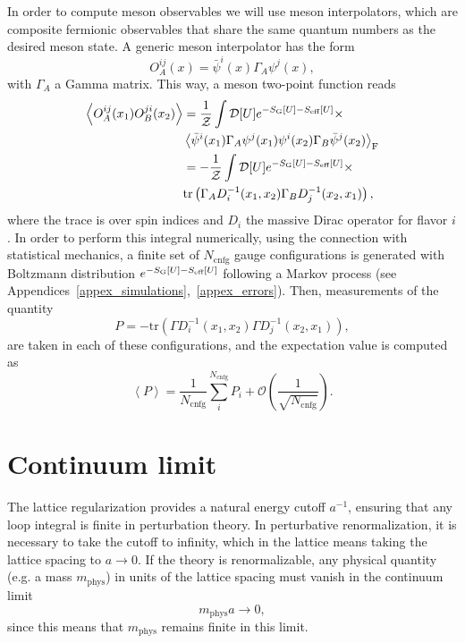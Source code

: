 In order to compute meson observables we will use meson interpolators, which are composite fermionic observables that share the same quantum numbers as the desired meson state. A generic meson interpolator has the form
\begin{equation}
{O}_A^{ij}(x)=\bar{\psi}^i(x)\Gamma_A\psi^j(x),
\end{equation}	
with $\Gamma_A$ a Gamma matrix. This way, a meson two-point function reads
\begin{align}
\label{ch_foundation:eq:path_int}
\left<{O}_A^{ij}(x_1){O}_B^{ji}(x_2)\right>&=\frac{1}{\mathcal{Z}}\int\mathcal{D}[U]e^{-S_{\textrm G}[U]-S_{\textrm{eff}}[U]}\times\\&\left<\bar{\psi}^i(x_1)\Gamma_A\psi^j(x_1)\psi^i(x_2)\Gamma_B\bar{\psi}^j(x_2)\right>_{\textrm F} \\
&=-\frac{1}{\mathcal{Z}}\int\mathcal{D}[U]e^{-S_{\textrm G}[U]-S_{\textrm{eff}}[U]}\times\\&{\textrm{tr}}\left(\Gamma_AD_i^{-1}(x_1,x_2)\Gamma_BD_j^{-1}(x_2,x_1)\right),
\end{align}
where the trace is over spin indices and $D_i$ the massive Dirac operator for flavor $i$. In order to perform this integral numerically, using the connection with statistical mechanics, a finite set of $N_{\textrm{cnfg}}$ gauge configurations is generated with Boltzmann distribution $e^{-S_{\textrm G}[U]-S_{\textrm{eff}}[U]}$ following a Markov process (see Appendices~\ref{appex_simulations},~\ref{appex_errors}). Then, measurements of the quantity
\begin{equation}
P=-{\textrm{tr}}\left(\Gamma D_i^{-1}(x_1,x_2)\Gamma D_j^{-1}(x_2,x_1)\right),
\end{equation}
are taken in each of these configurations, and the expectation value is computed as
\begin{equation}
\left<P\right>=\frac{1}{N_{\textrm{cnfg}}}\sum_{i}^{N_{\textrm{cnfg}}}P_i+\mathcal{O}\left(\frac{1}{\sqrt{N_{\textrm{cnfg}}}}\right).
\end{equation}



\section{Continuum limit}
\label{ch_foundation:sec:continuum-limit}

The lattice regularization provides a natural energy cutoff $a^{-1}$, ensuring that any loop integral is finite in perturbation theory. In perturbative renormalization, it is necessary to take the cutoff to infinity, which in the lattice means taking the lattice spacing to $a\rightarrow0$. If the theory is renormalizable, any physical quantity (e.g. a mass $m_{\textrm{phys}}$) in units of the lattice spacing must vanish in the continuum limit
\begin{equation}
\label{ch_foundation:eq:ma0}
m_{\textrm{phys}}a\rightarrow0,
\end{equation}
since this means that $m_{\textrm{phys}}$ remains finite in this limit. 

